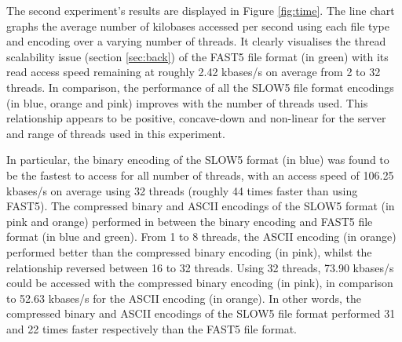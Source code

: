 The second experiment's results are displayed in Figure \ref{fig:time}. The line chart graphs the average number of kilobases accessed per second using each file type and encoding over a varying number of threads. It clearly visualises the thread scalability issue (section \ref{sec:back}) of the FAST5 file format (in green) with its read access speed remaining at roughly 2.42 kbases/s on average from 2 to 32 threads. In comparison, the performance of all the SLOW5 file format encodings (in blue, orange and pink) improves with the number of threads used. This relationship appears to be positive, concave-down and non-linear for the server and range of threads used in this experiment.

In particular, the binary encoding of the SLOW5 format (in blue) was found to be the fastest to access for all number of threads, with an access speed of 106.25 kbases/s on average using 32 threads (roughly 44 times faster than using FAST5). The compressed binary and ASCII encodings of the SLOW5 format (in pink and orange) performed in between the binary encoding and FAST5 file format (in blue and green). From 1 to 8 threads, the ASCII encoding (in orange) performed better than the compressed binary encoding (in pink), whilst the relationship reversed between 16 to 32 threads. Using 32 threads, 73.90 kbases/s could be accessed with the compressed binary encoding (in pink), in comparison to 52.63 kbases/s for the ASCII encoding (in orange). In other words, the compressed binary and ASCII encodings of the SLOW5 file format performed 31 and 22 times faster respectively than the FAST5 file format.

